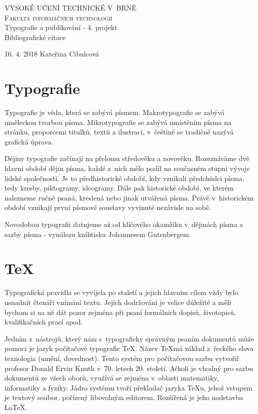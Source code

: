 \documentclass[a4paper, 11pt]{article}
\begin{document}
\begin{titlepage}
    \begin{center}
	    \textsc{\Huge{VYSOKÉ UČENÍ TECHNICKÉ V~BRNĚ} \\
		\Large{Fakulta informačních technologií}\\}
	    \Large{Typografie a publikování - 4. projekt}\\
    	\Huge{Bibliografické citace}\\
    \end{center}

    {\LARGE 16. 4. 2018 \hfill Kateřina Cibulcová}
\end{titlepage}
\newpage
\pagestyle{plain}



\section{Typografie}
Typografie je věda, která se zabývá písmem. \cite{Kuzu} Makrotypografie se zabývá uměleckou tvorbou písma. Mikrotypografie se zabývá umístěním písma na stránku, proporcemi titulků, textů a ilustrací, v~češtině se tradičně nazývá grafická úprava. \cite{Typo}

Dějiny typografie začínají na přelomu středověku a novověku. Rozeznáváme dvě hlavní období dějin písma, každé z~nich mělo podíl na současném stupni vývoje lidské společnosti. Je to předhistorické období, kdy vznikali předchůdci písma, tedy kresby, piktogramy, ideogramy. Dále pak historické období, ve kterém nalezneme ručně psaná, kreslená nebo jinak utvářená písma. Právě v~historickém období vznikají první písmové soustavy vyvinuté nezávisle na sobě. \cite{Atlantic} 

Novodobou typografii datujeme až od klíčového okamžiku v~dějinách písma a sazby písma - vynálezu knihtisku Johannesem Gutenbergem. \cite{Uhlirova}

\section{\TeX}
Typografická pravidla se vyvíjela po staletí a jejich hlavním cílem vždy bylo usnadnit čtenáři vnímání textu. \cite{Matysova}
Jejich dodržování je velice důležité a měli bychom si na ně dát pozor zejména při psaní formálních dopisů, životopisů, kvalifikačních prací apod.

Jedním z~nástrojů, který nám s~typograficky správným psaním dokumentů může pomoci je jazyk počítačové typografie \TeX. Název \TeX  má základ z~řeckého slova texnologia (umění, dovednost). Tento systém pro počítačovou sazbu vytvořil profesor Donald Ervin Knuth v~70. letech 20. století. \cite{Janecek} Ačkoli je vhodný pro sazbu dokumentů ze všech oborů, využívá se zejména v~oblasti matematiky, informatiky a fyziky. Jádro systému tvoří překladač jazyka \TeX u, jehož vstupem je textový soubor, pořízený libovolným editorem. \cite{Cerny} Rozšířená je jeho nadstavba \LaTeX. 
\end{document}
